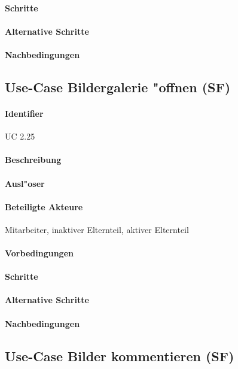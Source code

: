   \paragraph{Schritte}
  \paragraph{Alternative Schritte}
  \paragraph{Nachbedingungen}

  
  \newpage
 \subsection{Use-Case Bildergalerie "offnen (SF)}
  \paragraph{Identifier}
  UC 2.25
  \paragraph{Beschreibung}
  \paragraph{Ausl"oser}
  \paragraph{Beteiligte Akteure}   \leavevmode \newline
    Mitarbeiter, inaktiver Elternteil, aktiver Elternteil
  \paragraph{Vorbedingungen}
  \paragraph{Schritte}
  \paragraph{Alternative Schritte}
  \paragraph{Nachbedingungen}

  
  \newpage
 \subsection{Use-Case Bilder kommentieren (SF)}
